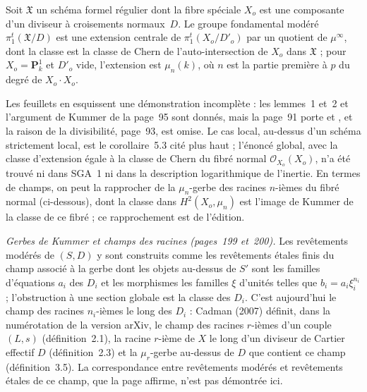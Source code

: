 \begin{encadre}
\begin{theoreme*}\nonverifie
Soit $\mathfrak X$ un schéma formel régulier dont la fibre spéciale $X_o$ est une composante d'un diviseur à croisements normaux~$D$. Le groupe fondamental modéré $\pi_1^t(\mathfrak X/D)$ est une extension centrale de $\pi_1^t(X_o/D'_o)$ par un quotient de $\mu^\infty$, dont la classe est la classe de Chern de l'auto-intersection de $X_o$ dans $\mathfrak X$ ; pour $X_o = \mathbf P^1_k$ et $D'_o$ vide, l'extension est $\mu_n(k)$, où $n$ est la partie première à $p$ du degré de $X_o \cdot X_o$.
\end{theoreme*}
\end{encadre}
{\small Les feuillets en esquissent une démonstration incomplète : les lemmes~1 et~2 et l'argument de Kummer de la page~95 sont donnés, mais la page~91 porte  et , et la raison de la divisibilité, page~93, est omise. Le cas local, au-dessus d'un schéma strictement local, est le corollaire~5.3 cité plus haut ; l'énoncé global, avec la classe d'extension égale à la classe de Chern du fibré normal $\mathcal O_{X_o}(X_o)$, n'a été trouvé ni dans SGA~1 ni dans la description logarithmique de l'inertie. En termes de champs, on peut la rapprocher de la $\mu_n$-gerbe des racines $n$-ièmes du fibré normal (ci-dessous), dont la classe dans $H^2(X_o, \mu_n)$ est l'image de Kummer de la classe de ce fibré ; ce rapprochement est de l'édition.\par}

\noindent\emph{Gerbes de Kummer et champs des racines (pages~199 et~200).} Les revêtements modérés de $(S, D)$ y sont construits comme les revêtements étales finis du champ associé à la gerbe dont les objets au-dessus de $S'$ sont les familles d'équations $a_i$ des $D_i$ et les morphismes les familles $\xi$ d'unités telles que $b_i = a_i \xi_i^{n_i}$ ; l'obstruction à une section globale est la classe des $D_i$. C'est aujourd'hui le champ des racines $n_i$-ièmes le long des $D_i$ : Cadman (2007) \cite{cadman2007} définit, dans la numérotation de la version arXiv, le champ des racines $r$-ièmes d'un couple $(L, s)$ (définition~2.1), la racine $r$-ième de $X$ le long d'un diviseur de Cartier effectif $D$ (définition~2.3) et la $\mu_r$-gerbe au-dessus de $D$ que contient ce champ (définition~3.5). La correspondance entre revêtements modérés et revêtements étales de ce champ, que la page affirme, n'est pas démontrée ici.


